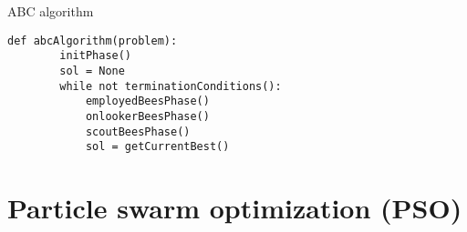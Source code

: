 \begin{algorithm}
\caption{ABC algorithm}
\begin{lstlisting}[mathescape=true]
    def abcAlgorithm(problem):
        initPhase()
        sol = None
        while not terminationConditions():
            employedBeesPhase()
            onlookerBeesPhase()
            scoutBeesPhase()
            sol = getCurrentBest()
\end{lstlisting}
\end{algorithm}



\section{Particle swarm optimization (PSO)}
